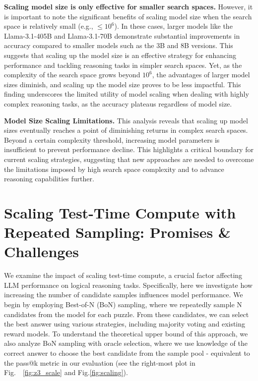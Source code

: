 \textbf{Scaling model size is only effective for smaller search spaces.}
However, it is important to note the significant benefits of scaling model size when the search space is relatively small (e.g., \(\le 10^6\)). In these cases, larger models like the Llama-3.1-405B and Llama-3.1-70B demonstrate substantial improvements in accuracy compared to smaller models such as the 3B and 8B versions. This suggests that scaling up the model size is an effective strategy for enhancing performance and tackling reasoning tasks in simpler search spaces. Yet, as the complexity of the search space grows beyond \(10^6\), the advantages of larger model sizes diminish, and scaling up the model size proves to be less impactful. This finding underscores the limited utility of model scaling when dealing with highly complex reasoning tasks, as the accuracy plateaus regardless of model size.


\textbf{Model Size Scaling Limitations.}
This analysis reveals that scaling up model sizes eventually reaches a point of diminishing returns in complex search spaces. Beyond a certain complexity threshold, increasing model parameters is insufficient to prevent performance decline. This highlights a critical boundary for current scaling strategies, suggesting that new approaches are needed to overcome the limitations imposed by high search space complexity and to advance reasoning capabilities further.






\section{Scaling Test-Time Compute with Repeated Sampling: Promises \& Challenges}
\label{sec:sampling_scale}

We examine the impact of scaling test-time compute, a crucial factor affecting LLM performance on logical reasoning tasks. Specifically, here we investigate how increasing the number of candidate samples influences model performance.
We begin by employing Best-of-N (BoN) sampling, where we repeatedly sample N candidates from the model for each puzzle. From these candidates, we can select the best answer using various strategies, including majority voting and existing reward models. To understand the theoretical upper bound of this approach, we also analyze BoN sampling with oracle selection, where we use knowledge of the correct answer to choose the best candidate from the sample pool - equivalent to the pass@k metric in our evaluation (see the right-most plot in Fig.~~\ref{fig:z3_scale} and Fig.\ref{fig:scaling}).




